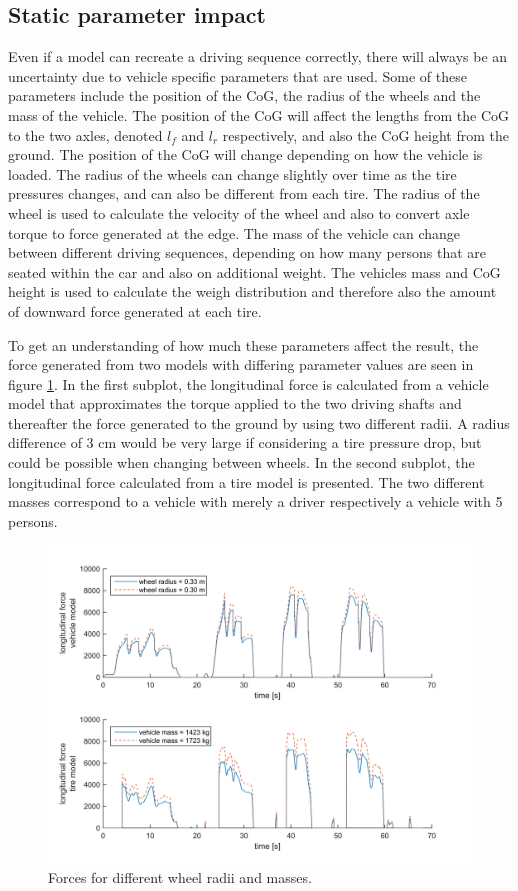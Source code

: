 \subsection{Static parameter impact} 
Even if a model can recreate a driving sequence correctly, there will always be an uncertainty due to vehicle specific parameters that are used. Some of these parameters include the position of the CoG, the radius of the wheels and the mass of the vehicle. The position of the CoG will affect the lengths from the CoG to the two axles, denoted $ l_{f} $ and $ l_{r} $ respectively, and also the CoG height from the ground. The position of the CoG will change depending on how the vehicle is loaded. The radius of the wheels can change slightly over time as the tire pressures changes, and can also be different from each tire. The radius of the wheel is used to calculate the velocity of the wheel and also to convert axle torque to force generated at the edge. The mass of the vehicle can change between different driving sequences, depending on how many persons that are seated within the car and also on additional weight. The vehicles mass and CoG height is used to calculate the weigh distribution and therefore also the amount of downward force generated at each tire. 

To get an understanding of how much these parameters affect the result, the force generated from two models with differing parameter values are seen in figure \ref{force_diff_re_mass}. In the first subplot, the longitudinal force is calculated from a vehicle model that approximates the torque applied to the two driving shafts and thereafter the force generated to the ground by using two different radii. A radius difference of $ 3 $ cm would be very large if considering a tire pressure drop, but could be possible when changing between wheels. In the second subplot, the longitudinal force calculated from a tire model is presented. The two different masses correspond to a vehicle with merely a driver respectively a vehicle with 5 persons. 

\begin{figure}[h]
	\centering
	\includegraphics[width=1.0\textwidth]{Pictures/force_diff_re_mass}
	\caption {Forces for different wheel radii and masses.}
	\label{force_diff_re_mass}
\end{figure}

